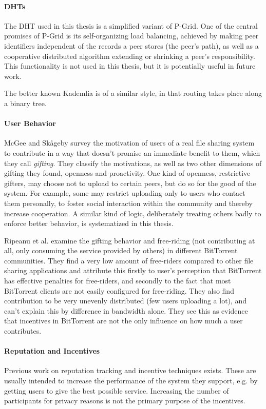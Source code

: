 \paragraph{DHTs}
The DHT used in this thesis is a simplified variant of
P-Grid\cite{aberer2001pgrid}. One of the central promises of P-Grid is its
self-organizing load balancing, achieved by making peer identifiers independent
of the records a peer stores (the peer's path), as well as a cooperative
distributed algorithm extending or shrinking a peer's responsibility. This
functionality is not used in this thesis, but it is potentially useful in future
work.

The better known Kademlia\cite{maymounkov2002kademlia} is of a similar style, in
that routing takes place along a binary tree.

\paragraph{User Behavior}
McGee and Sk{\aa}geby\cite{mcgee2004gifting} survey the motivation of users of a
real file sharing system to contribute in a way that doesn't promise an
immediate benefit to them, which they call \emph{gifting}. They classify the
motivations, as well as two other dimensions of gifting they found, openness and
proactivity. One kind of openness, restrictive gifters, may choose not to upload
to certain peers, but do so for the good of the system. For example, some may
restrict uploading only to users who contact them personally, to foster social
interaction within the community and thereby increase cooperation. A similar
kind of logic, deliberately treating others badly to enforce better behavior, is
systematized in this thesis.

Ripeanu et al.\cite{ripeanu2006gifting} examine the gifting behavior and
free-riding (not contributing at all, only consuming the service provided by
others) in different BitTorrent communities. They find a very low amount of
free-riders compared to other file sharing applications and attribute this
firstly to user's perception that BitTorrent has effective penalties for
free-riders, and secondly to the fact that most BitTorrent clients are not
easily configured for free-riding. They also find contribution to be very
unevenly distributed (few users uploading a lot), and can't explain this by
difference in bandwidth alone. They see this as evidence that incentives in
BitTorrent are not the only influence on how much a user contributes.

\paragraph{Reputation and Incentives}
Previous work on reputation tracking and incentive techniques exists. These are
usually intended to increase the performance of the system they support, e.g. by
getting users to give the best possible service. Increasing the number of
participants for privacy reasons is not the primary purpose of the incentives.

